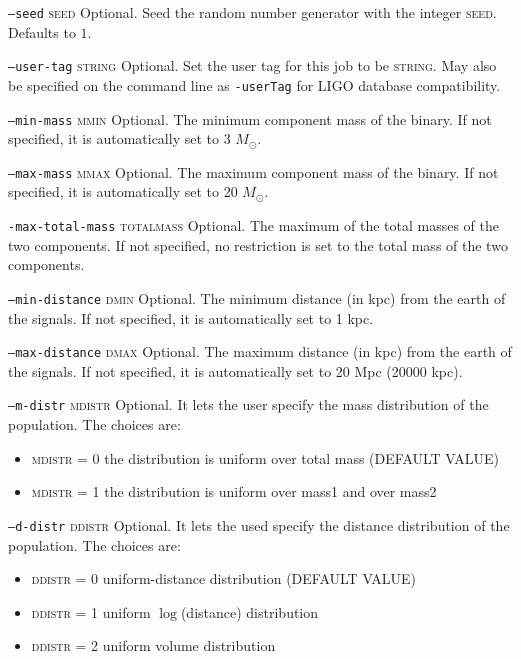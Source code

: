 \begin{entry}
\begin{entry}
\item[\texttt{--seed} \textsc{seed}]
Optional. Seed the random number generator with the integer \textsc{seed}.
Defaults to $1$.

\item[\texttt{--user-tag} \textsc{string}] Optional. Set the user tag for this
job to be \textsc{string}. May also be specified on the command line as 
\texttt{-userTag} for LIGO database compatibility.

\item[\texttt{--min-mass} \textsc{mmin}] Optional. The minimum component 
mass of the binary. If not specified, it is automatically set to 3 
$M_\odot$.

\item[\texttt{--max-mass} \textsc{mmax}] Optional. The maximum component 
mass of the binary. If not specified, it is automatically set to 20 
$M_\odot$.

\item[\texttt{-max-total-mass} \textsc{totalmass}] Optional. The maximum of the total masses of the two components. If not specified, no restriction is set to the total mass of the two components. 

\item[\texttt{--min-distance} \textsc{dmin}] Optional. The minimum distance
(in kpc) from the earth of the signals. If not specified, it is automatically 
set to 1 kpc.

\item[\texttt{--max-distance} \textsc{dmax}] Optional. The maximum distance
(in kpc) from the earth of the signals. If not specified, it is automatically 
set to 20 Mpc (20000 kpc).

\item[\texttt{--m-distr} \textsc{mdistr}] Optional. It lets the user specify
the mass distribution of the population. The choices are:
 \begin{itemize} 
 \item \textsc{mdistr} = 0 the distribution is uniform over total mass
 (DEFAULT VALUE)
 \item \textsc{mdistr} = 1 the distribution is uniform over mass1 and
    over mass2
 \end{itemize}

\item[\texttt{--d-distr} \textsc{ddistr}] Optional. It lets the used
specify the distance distribution of the population. The choices are:
 \begin{itemize} 
 \item \textsc{ddistr} = 0 uniform-distance distribution
 (DEFAULT VALUE)
 \item \textsc{ddistr} = 1 uniform $\log$(distance) distribution
 \item \textsc{ddistr} = 2 uniform volume distribution
 \end{itemize}


\end{entry}
\end{entry}
